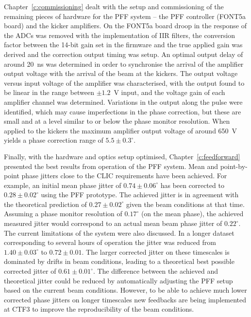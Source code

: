 Chapter~\ref{c:commissioning} dealt with the setup and commissioning of the remaining pieces of hardware for the PFF system -- the PFF controller (FONT5a board) and the kicker amplifiers. On the FONT5a board droop in the response of the ADCs was removed with the implementation of IIR filters, the conversion factor between the 14-bit gain set in the firmware and the true applied gain was derived and the correction output timing was setup. An optimal output delay of around 20~ns was determined in order to synchronise the arrival of the amplifier output voltage with the arrival of the beam  at the kickers. The output voltage versus input voltage of the amplifier was characterised, with the output found to be linear in the range between \(\pm1.2\)~V input, and the voltage gain of each amplifier channel was determined. Variations in the output along the pulse were identified, which may cause imperfections in the phase correction, but these are small and at a level similar to or below the phase monitor resolution. When applied to the kickers the maximum amplifier output voltage of around 650~V yields a phase correction range of \(5.5\pm0.3^\circ\).

Finally, with the hardware and optics setup optimised, Chapter~\ref{c:feedforward} presented the best results from operation of the PFF system. Mean and point-by-point phase jitters close to the CLIC requirements have been achieved. For example, an initial mean phase jitter of \(0.74\pm0.06^\circ\) has been corrected to \(0.28\pm0.02^\circ\) using the PFF prototype. The achieved jitter is in agreement with the theoretical prediction of \(0.27\pm0.02^\circ\) given the beam conditions at that time. 
Assuming a phase monitor resolution of \(0.17^\circ\) (on the mean phase), the achieved measured jitter would correspond to an actual mean beam phase jitter of \(0.22^\circ\). 
The current limitations of the system were also discussed. In a longer dataset corresponding to several hours of operation the jitter was reduced from \(1.40\pm0.03^\circ\) to \(0.72\pm0.01\). The larger corrected jitter on these timescales is dominated by drifts in beam conditions, leading to a theoretical best possible corrected jitter of \(0.61\pm0.01^\circ\). The difference between the achieved and theoretical jitter could be reduced by automatically adjusting the PFF setup based on the current beam conditions. However, to be able to achieve much lower corrected phase jitters on longer timescales new feedbacks are being implemented at CTF3 to improve the reproducibility of the beam conditions. 

